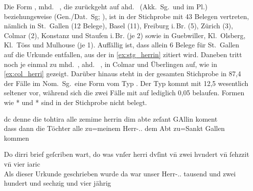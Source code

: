 Die Form , mhd.~ , die zurückgeht
auf ahd.~ (Akk.~Sg.\ und im Pl.) beziehungsweise
 (Gen./Dat.~Sg; \cite[vgl.][282--283]{braune2018}), ist in der
Stichprobe mit 43 Belegen vertreten, nämlich in St.~Gallen (12 Belege), Basel
(11), Freiburg i.\,Br. (5), Zürich (3), Colmar (2), Konstanz und Staufen
i.\,Br. (je 2) sowie in Guebwiller, Kl.~Olsberg, Kl.~Töss und Mulhouse (je 1).
Auffällig ist, dass allein 6 Belege für St.~Gallen auf die Urkunde
 entfallen, aus der in \cref{ex:stg_herrin} zitiert
wird. Daneben tritt noch je einmal  zu mhd.~,
ahd.~ , in Colmar und Überlingen auf, wie in
\cref{ex:col_herri} gezeigt. Darüber hinaus steht in der gesamten Stichprobe in
87,4\pct{} der Fälle im Nom.~Sg.\ eine Form vom Typ . Der Typ
 kommt mit 12,5\pct{} wesentlich seltener vor, während sich die zwei
Fälle mit  auf lediglich 0,05\pct{} belaufen. Formen wie *
und * sind in der Stichprobe nicht belegt.

\begin{exe}
\ex \label{ex:herrin}
	\begin{xlist}
	\ex\label{ex:stg_herrin}
		\setlength{\glossglue}{5pt plus 2pt minus 1pt}
		\gll dc denne die tohtira alle zemime herrin dim abte zeſant GAllin
				koment\\
			dass dann die Töchter alle zu=meinem Herr-\Obl.\Sg.\MascM{} dem Abt
				zu=Sankt Gallen kommen \\
		\begin{taggedline}{\autocites(St.~Gallen, 1284)[\pno~628, 56.34]{cao2}}
		\trans {}
		\end{taggedline}

	\ex\label{ex:col_herri}
		\gll Do dirri brief geſcriben wart, do was vnſer herri dvſint vn̄ zwei
				hvndert vn̄ ſehzzit vn̄ vier iaric \\
			Als dieser Urkunde geschrieben wurde da war unser
				Herr-\Nom.\Sg.\MascM{} tausend und zwei hundert und sechzig und
				vier jährig \\
		\begin{taggedline}{\autocites(Colmar, 1264)[\pno~N~53, 37.15]{cao5}}
		\trans {}
		\end{taggedline}
\end{xlist}
\end{exe}

